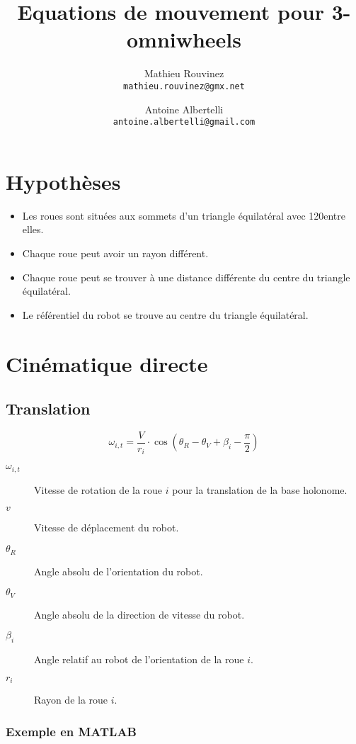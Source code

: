 \documentclass[a4paper]{paper}
\author{
Mathieu Rouvinez \\
\texttt{mathieu.rouvinez@gmx.net}
\and
Antoine Albertelli \\
\texttt{antoine.albertelli@gmail.com}
}
\title{Equations de mouvement pour 3-omniwheels}
\begin{document}
\maketitle
\section{Hypothèses}
\begin{itemize}
    \item Les roues sont situées aux sommets d'un triangle équilatéral avec 120\degre entre elles.
    \item Chaque roue peut avoir un rayon différent.
    \item Chaque roue peut se trouver à une distance différente du centre du triangle équilatéral.
    \item Le référentiel du robot se trouve au centre du triangle équilatéral.
\end{itemize}

\section{Cinématique directe}

\subsection{Translation}

\begin{equation}
    \omega_{i,t} = \frac{V}{r_i} \cdot \cos\left( \theta_R - \theta_V + \beta_i - \frac{\pi}{2} \right)
    \label{eqn:forward-translation}
\end{equation}

\begin{description}
    \item[$\omega_{i,t}$] Vitesse de rotation de la roue $i$ pour la translation de la base holonome.
    \item[$v$] Vitesse de déplacement du robot.
    \item[$\theta_R$] Angle absolu de l'orientation du robot.
    \item[$\theta_V$] Angle absolu de la direction de vitesse du robot.
    \item[$\beta_i$] Angle relatif au robot de l'orientation de la roue $i$.
    \item[$r_i$] Rayon de la roue $i$.
\end{description}
\subsubsection{Exemple en MATLAB}
\end{document}
